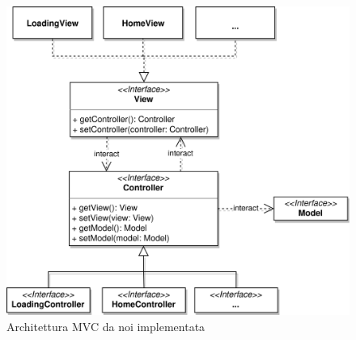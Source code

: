 \documentclass[a4paper,12pt]{report}
\begin{document}
\begin{figure}[H]
    \begin{center}
        \centering
        \includegraphics[scale=0.8]{img/MVC/mvc.png}
    \end{center}
    \caption{Architettura MVC da noi implementata}
    \label{img:analysis2}
\end{figure}
\end{document}
